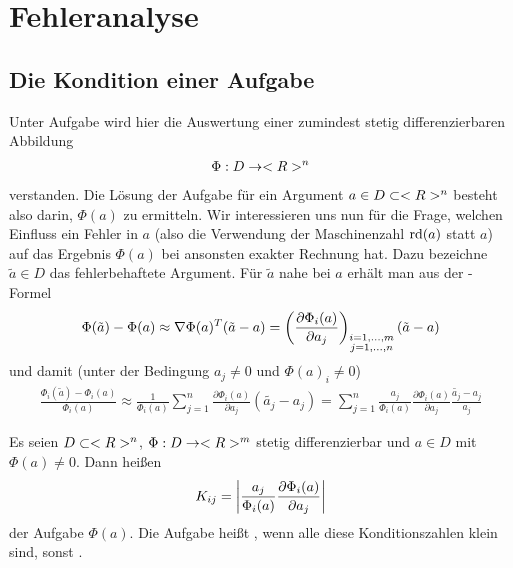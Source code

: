 \section{Fehleranalyse}

\subsection{Die Kondition einer Aufgabe}

Unter Aufgabe wird hier die Auswertung einer zumindest stetig differenzierbaren Abbildung
\begin{align}
	\Phi: D\to<R>^n\notag
\end{align}
verstanden. Die Lösung der Aufgabe für ein Argument $a\in D\subset<R>^n$ besteht also darin, $\Phi(a)$ zu ermitteln. Wir interessieren uns nun für die Frage, welchen Einfluss ein Fehler in $a$ (also die Verwendung der Maschinenzahl $\operatorname{rd}(a)$ statt $a$) auf das Ergebnis $\Phi(a)$ bei ansonsten exakter Rechnung hat. Dazu bezeichne $\tilde{a}\in D$ das fehlerbehaftete Argument. Für $\tilde{a}$ nahe bei $a$ erhält man aus der -Formel
\begin{align}
	\Phi(\tilde{a}) - \Phi(a) \approx\nabla\Phi(a)^T(\tilde{a}-a)= \left( \frac{\partial \Phi_i(a)}{\partial a_j}\right) _{\substack{i=1,...,m \\ j=1,...,n}} (\tilde{a}-a)\notag
\end{align}
und damit (unter der Bedingung $a_j\neq 0$ und $\Phi(a)_i\neq 0$)
\begin{align}
	\label{4.1}
	\frac{\Phi_i(\tilde{a}) - \Phi_i(a)}{\Phi_i(a)} \approx \frac{1}{\Phi_i(a)}\sum_{j=1}^{n}\frac{\partial \Phi_i(a)}{\partial a_j} (\tilde{a_j}-a_j) = \sum_{j=1}^n \frac{a_j}{\Phi_i(a)}\frac{\partial\Phi_i(a)}{\partial a_j}\frac{\tilde{a_j}-a_j}{a_j}
\end{align}

\begin{definition}
	Es seien $D\subset<R>^n$, $\Phi:D\to<R>^m$ stetig differenzierbar und $a\in D$ mit $\Phi(a)\neq 0$. Dann heißen
	\begin{align}
		K_{ij} = \left|\frac{a_j}{\Phi_i(a)}\frac{\partial\Phi_i(a)}{\partial a_j}\right|\notag
	\end{align}
	 der Aufgabe $\Phi(a)$. Die Aufgabe heißt , wenn alle diese Konditionszahlen klein sind, sonst .
\end{definition}

